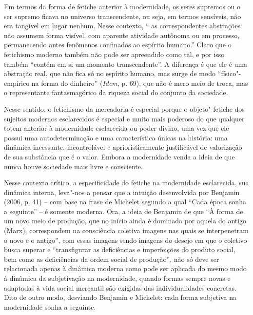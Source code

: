 Em termos da forma de fetiche anterior à modernidade, os seres supremos
ou o ser supremo ficava no universo transcendente, ou seja, em termos
sensíveis, não era tangível em lugar nenhum. Nesse contexto, `` as
correspondentes abstrações não assumem forma visível, com aparente
atividade autônoma ou em processo, permanecendo antes fenômenos
confinados ao espírito humano.'' Claro que o fetichismo moderno também
não pode ser apreendido como tal, e por isso também ``contém em si um
momento transcendente''. A diferença é que ele é uma abstração real, que
não fica só no espírito humano, mas surge de modo ``físico"-empírico na
forma do dinheiro'' (\emph{Idem}, p. 69), que não é mero meio de troca,
mas o representante fantasmagórico da riqueza social do conjunto da
sociedade.

Nesse sentido, o fetichismo da mercadoria é especial porque o
objeto"-fetiche dos sujeitos modernos esclarecidos é especial e muito
mais poderoso do que qualquer totem anterior à modernidade esclarecida
ou poder divino, uma vez que ele possui uma autodeterminação e uma
característica únicas na história: uma dinâmica incessante,
incontrolável e aprioristicamente justificável de valorização de sua
substância que é o valor. Embora a modernidade venda a ideia de que
nunca houve sociedade mais livre e consciente.

Nesse contexto crítico, a especificidade do fetiche na modernidade
esclarecida, sua dinâmica interna, leva"-nos a pensar que a intuição
desenvolvida por Benjamin (2006, p. 41) -- com base na frase de Michelet
segundo a qual ``Cada época sonha a seguinte'' -- é somente moderna.
Ora, a ideia de Benjamin de que ``À forma de um novo meio de produção,
que no início ainda é dominada por aquela do antigo (Marx), correspondem
na consciência coletiva imagens nas quais se interpenetram o novo e o
antigo'', com essas imagens sendo imagens do desejo em que o coletivo
busca superar e ``transfigurar as deficiências e imperfeições do produto
social, bem como as deficiências da ordem social de produção'', não só
deve ser relacionada apenas à dinâmica moderna como pode ser aplicada do
mesmo modo à dinâmica da subjetivação na modernidade, quando formas
sempre novas e adaptadas à vida social mercantil são exigidas das
individualidades concretas. Dito de outro modo, desviando Benjamin e
Michelet: cada forma subjetiva na modernidade sonha a seguinte.

